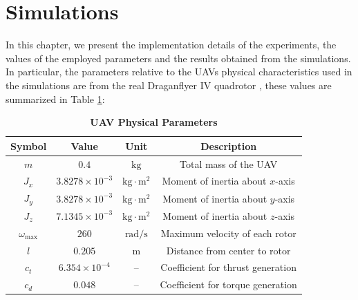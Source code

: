 \documentclass[main]{subfiles}
\begin{document}
\section{Simulations}
In this chapter, we present the implementation details of the experiments,
the values of the employed parameters and the results obtained from the simulations.
In particular, the parameters relative to the UAVs physical
characteristics used in the simulations are from 
the real Draganflyer IV quadrotor \cite{drone}, these values are
summarized in Table \ref{tab:drone_parameters}:
\begin{table}[H]
\centering
\caption{\textbf{UAV Physical Parameters}}
\begin{tabular}{c c c c}
\hline\hline
\textbf{Symbol}     & \textbf{Value}       & \textbf{Unit}         & \textbf{Description} \\ \hline\hline
\(m\)               & \(0.4\)              & \(\text{kg}\)          & Total mass of the UAV \\
\(J_x\)             & \(3.8278 \times 10^{-3}\) & \(\text{kg}\cdot\text{m}^2\) & Moment of inertia about $x$-axis \\
\(J_y\)             & \(3.8278 \times 10^{-3}\) & \(\text{kg}\cdot\text{m}^2\) & Moment of inertia about $y$-axis \\
\(J_z\)             & \(7.1345 \times 10^{-3}\) & \(\text{kg}\cdot\text{m}^2\) & Moment of inertia about $z$-axis \\
$\omega_\text{max}$ &$260$                  &$\text{rad/s}$                    & Maximum  velocity of each rotor\\
\(l\)               & \(0.205\)            & \(\text{m}\)           & Distance from center to rotor \\
\(c_t\)             & \(6.354 \times 10^{-4}\) & --                     & Coefficient for thrust generation \\
\(c_d\)             & \(0.048\)            & --                     & Coefficient for torque generation \\
\hline\hline
\end{tabular}
\label{tab:drone_parameters}
\end{table}
\end{document}
